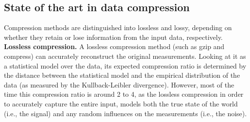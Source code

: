 

\subsection{State of the art in data compression}

Compression methods are distinguished into lossless and lossy, depending on whether they retain or lose information from the input data, respectively.\\

{\bf Lossless compression.}  A lossless compression method (such as gzip and compress) can accurately reconstruct the original measurements. Looking at it as a statistical model over the data, its expected compression ratio is determined by the distance between the statistical model and the empirical distribution of the data (as measured by the Kullback-Leibler divergence). However, most of the time this compression ratio is around 2 to 4, as the lossless compression in order to accurately capture the entire input, models both the true state of the world (i.e., the signal) and any random influences on the measurements (i.e., the noise).\\



